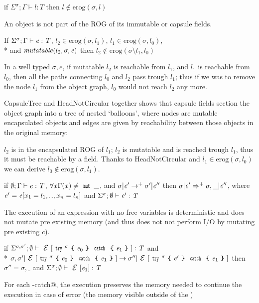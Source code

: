 \begin{Assumption}[HeadNotCircular]
if
$\Sigma^\sigma;\Gamma\vdash l:T$
then $l\notin\text{erog}(\sigma,l)$
\end{Assumption}
\noindent
\noindent An object is not part of the ROG of its immutable or capsule fields.


\begin{Assumption}[CapsuleTree]
If   $\Sigma^\sigma;\Gamma\vdash \e:\T$,
$l_2\in\text{erog}(\sigma,l_1)$,
$l_1\in\text{erog}(\sigma,l_0)$,\\*
and
$\mathit{mutatable}(l_2,\sigma,\e)$
then 
$l_2\notin\text{erog}(\sigma\setminus l_1,l_0)$
\end{Assumption}
\noindent In a well typed $\sigma,e$, if mutatable $l_2$ is reachable from
$l_1$, and $l_1$ is reachable from $l_0$,
then all the paths connecting $l_0$ and $l_2$ pass trough $l_1$; thus
if we was to remove the node $l_1$ from the object graph, $l_0$ would not reach $l_2$ any more.


CapsuleTree and HeadNotCircular together 
shows that capsule fields section the object graph into a tree of nested `balloons',
where nodes are mutable encapsulated objects and
edges are given by reachability between those objects in the original memory:

$l_2$ is in the encapsulated ROG of $l_1$;
$l_2$ is mutatable and is reached trough $l_1$, thus
it must be reachable by a \Q@capsule@ field.
Thanks to HeadNotCircular and $l_1\in\text{erog}(\sigma,l_0)$ we can derive 
$l_0\notin\text{erog}(\sigma,l_1)$.



\begin{Assumption}[Determinism]
if $\emptyset;\Gamma\vdash \e:\T$, 
$\forall x \Gamma(x)\neq\Kw{mut}\,\_$, and
$\sigma | \e'\rightarrow^+ \sigma' | \e''$
then 
$\sigma | \e'\Rightarrow^+ \sigma,\_ | \e''$,
where $\e'=\e[x_1=l_1,\ldots,x_n=l_n]$ and $\Sigma^\sigma;\emptyset\vdash \e':\T$
\end{Assumption}
\noindent The execution of an expression
with no \Q@mut@ free variables is deterministic and does not
  mutate pre existing memory (and thus does not not perform I/O by mutating pre existing $c$).


\begin{Assumption}[StrongExceptionSafety]
if $\Sigma^{\sigma,\sigma'};\emptyset\vdash \ctx[\Kw{try}^\sigma\oC\e_0\cC\Kw{catch}\oC\e_1\cC]:\T$
and\\*
$
\sigma,\sigma'|\ctx[\Kw{try}^\sigma\oC\e_0\cC\Kw{catch}\oC\e_1\cC]\rightarrow 
\sigma''|\ctx[\Kw{try}^\sigma\oC\e'\cC\Kw{catch}\oC\e_1\cC]
$
then 
$\sigma''=\sigma,\_$
and
$\Sigma^\sigma;\emptyset\vdash \ctx[\e_1]:\T$
\end{Assumption}
\noindent
For each \Q@try-catch@, the execution preserves the memory needed to continue the execution in case of error
(the memory visible outside of the \Q@try@)%

